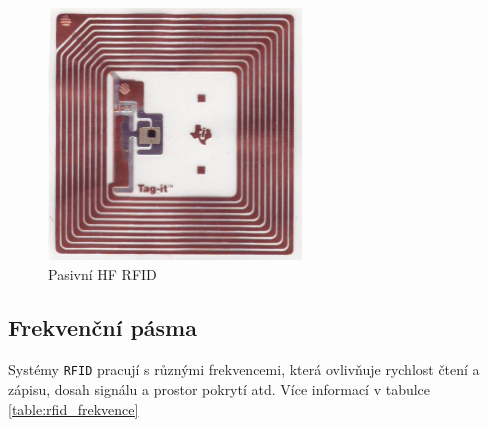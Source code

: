 \documentclass[czech,BP]{thesiskiv}
\begin{document}
\begin{figure}[ht]
   		 	\centering
			\includegraphics[width=0.6\textwidth]{../images/rfid_smart_label.jpg}	
			\caption{Pasivní HF RFID}
    		\label{fig:rfidsmartlabel}
		\end{figure}


\subsection{Frekvenční pásma}
Systémy \texttt{RFID} pracují s různými frekvencemi, která ovlivňuje rychlost čtení a zápisu, dosah signálu a prostor pokrytí atd.
Více informací v tabulce \ref{table:rfid_frekvence}
\end{document}
